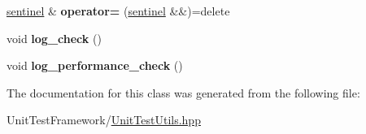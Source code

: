 \begin{DoxyCompactItemize}
\mbox{\label{classsequoia_1_1unit__testing_1_1unit__test__logger_1_1sentinel_afc0eb51bba287e231a38a98b0e653c25}} 
\mbox{\hyperlink{classsequoia_1_1unit__testing_1_1unit__test__logger_1_1sentinel}{sentinel}} \& {\bfseries operator=} (\mbox{\hyperlink{classsequoia_1_1unit__testing_1_1unit__test__logger_1_1sentinel}{sentinel}} \&\&)=delete
\item 
\mbox{\label{classsequoia_1_1unit__testing_1_1unit__test__logger_1_1sentinel_aae8d220c503e9e4e936e281616245fb7}} 
void {\bfseries log\+\_\+check} ()
\item 
\mbox{\label{classsequoia_1_1unit__testing_1_1unit__test__logger_1_1sentinel_a33e70e1d14abc99a7ae2103629a66a7e}} 
void {\bfseries log\+\_\+performance\+\_\+check} ()
\end{DoxyCompactItemize}


The documentation for this class was generated from the following file\+:\begin{DoxyCompactItemize}
\item 
Unit\+Test\+Framework/\mbox{\hyperlink{_unit_test_utils_8hpp}{Unit\+Test\+Utils.\+hpp}}\end{DoxyCompactItemize}
